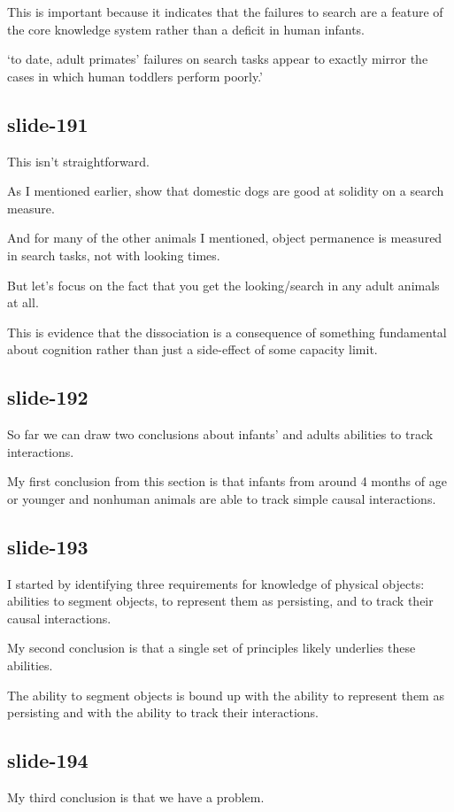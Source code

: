 \documentclass[12pt,\papersize]{extarticle}
\begin{document}
This is important because it indicates that the failures to search are a feature of the core knowledge system rather than a deficit in human infants.
 
‘to date, adult primates’ failures on search tasks appear to 
            exactly mirror the cases in which human toddlers perform poorly.’
\citep[p.\ 17]{santos:2009_object}
 
\subsection{slide-191}
This isn't straightforward.
 
As I mentioned earlier, \citep{kundey:2010_domesticated} show that domestic dogs are good at solidity on a search measure.
 
And for many of the other animals I mentioned, object permanence is measured in search tasks, not with looking times.
 
But let's focus on the fact that you get the looking/search in any adult animals at all.
 
This is evidence that the dissociation is a consequence of something fundamental about cognition rather than just a side-effect of some capacity limit.
 
\subsection{slide-192}
So far we can draw two conclusions about infants' and adults abilities to track interactions.
 
My first conclusion from this section is that infants from around 4 months of age or younger and nonhuman animals are able to track simple causal interactions.
 
\subsection{slide-193}
I started by identifying three requirements for knowledge of physical objects: 
            abilities to segment objects, to represent them as persisting, and to track their causal interactions.
 
My second conclusion is that a single set of principles likely underlies these abilities.
 
The ability to segment objects is bound up with the ability 
            to represent them as persisting and with the ability to track their interactions.
 
\subsection{slide-194}
My third conclusion is that we have a problem.
 
\end{document}
